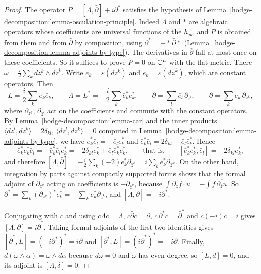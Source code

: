 \begin{proof}
The operator $P = [\Lambda, \bar\partial] + i\partial^*$ satisfies the hypothesis of
Lemma~\ref{hodge-decomposition:lemma-osculation-principle}. Indeed $\Lambda$ and $*$ are algebraic operators whose coefficients are
universal functions of the $h_{j\bar k}$, and $P$ is obtained from them and from $\bar\partial$ by composition, using
$\partial^* = -*\bar\partial*$ (Lemma~\ref{hodge-decomposition:lemma-adjoints-by-type}). The derivatives in $\bar\partial$ fall at most
once on these coefficients. So it suffices to prove $P = 0$ on $\mathbb{C}^n$ with the flat metric. There $\omega = \frac{i}{2}\sum_kdz^k \wedge d\bar z^k$.
Write $e_k = \varepsilon(dz^k)$ and $\bar e_k = \varepsilon(d\bar z^k)$, which are constant operators. Then
\[
L = \frac{i}{2}\sum_ke_k\bar e_k, \qquad \Lambda = L^* = -\frac{i}{2}\sum_k\bar e_k^*e_k^*, \qquad \bar\partial = \sum_l\bar e_l\,\partial_{\bar z^l},
\qquad \partial = \sum_ke_k\,\partial_{z^k},
\]
where $\partial_{z^k}$, $\partial_{\bar z^l}$ act on the coefficients and commute with the constant operators. By
Lemma~\ref{hodge-decomposition:lemma-car} and the inner products $\langle d\bar z^l, d\bar z^k\rangle = 2\delta_{kl}$,
$\langle d\bar z^l, dz^k\rangle = 0$ computed in Lemma~\ref{hodge-decomposition:lemma-adjoints-by-type}, we have
$e_k^*\bar e_l = -\bar e_le_k^*$ and $\bar e_k^*\bar e_l = 2\delta_{kl} - \bar e_l\bar e_k^*$. Hence
\[
\bar e_k^*e_k^*\bar e_l = -\bar e_k^*\bar e_le_k^* = -2\delta_{kl}e_k^* + \bar e_l\bar e_k^*e_k^*,
\qquad\text{that is,}\qquad [\bar e_k^*e_k^*, \bar e_l] = -2\delta_{kl}e_k^*,
\]
and therefore $[\Lambda, \bar\partial] = -\frac{i}{2}\sum_k(-2)e_k^*\partial_{\bar z^k} = i\sum_ke_k^*\partial_{\bar z^k}$. On the other hand,
integration by parts against compactly supported forms shows that the formal adjoint of $\partial_{z^k}$ acting on coefficients is
$-\partial_{\bar z^k}$, because $\int\partial_{z}f\cdot\bar u = -\int f\,\overline{\partial_{\bar z}u}$. So
$\partial^* = \sum_k(\partial_{z^k})^*e_k^* = -\sum_ke_k^*\partial_{\bar z^k}$, and $[\Lambda, \bar\partial] = -i\partial^*$.

Conjugating with $c$ and using $c\Lambda c = \Lambda$, $c\bar\partial c = \partial$, $c\,\partial^*c = \bar\partial^*$ and $c(-i)c = i$ gives
$[\Lambda, \partial] = i\bar\partial^*$. Taking formal adjoints of the first two identities gives
$[\bar\partial^*, L] = (-i\partial^*)^* = i\partial$ and $[\partial^*, L] = (i\bar\partial^*)^* = -i\bar\partial$. Finally,
$d(\omega \wedge \alpha) = \omega \wedge d\alpha$ because $d\omega = 0$ and $\omega$ has even degree, so $[L, d] = 0$, and its adjoint is
$[\Lambda, \delta] = 0$.
\end{proof}

